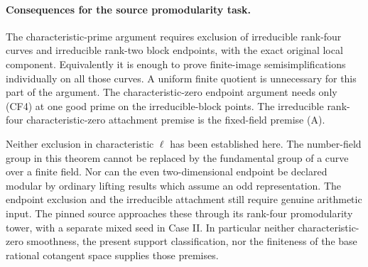 \paragraph{Consequences for the source promodularity task.}
The characteristic-prime argument requires exclusion of
irreducible rank-four curves and irreducible rank-two
block endpoints, with the exact original local component.
Equivalently it is enough to prove finite-image
semisimplifications individually on all those curves.
A uniform finite quotient is unnecessary for this
part of the argument. The characteristic-zero endpoint
argument needs only (CF4) at one good prime on the
irreducible-block points. The irreducible rank-four
characteristic-zero attachment premise is the fixed-field
premise (A).

Neither exclusion in characteristic \(\ell\) has been
established here. The number-field group in this
theorem cannot be replaced by the fundamental group
of a curve over a finite field.
Nor can the even two-dimensional endpoint be declared
modular by ordinary lifting results which assume an
odd representation. The endpoint exclusion and the
irreducible attachment still require genuine arithmetic
input. The pinned source approaches these through
its rank-four promodularity tower, with a separate
mixed seed in Case II. In particular neither
characteristic-zero smoothness, the present support
classification, nor the finiteness of the base
rational cotangent space supplies those premises.
